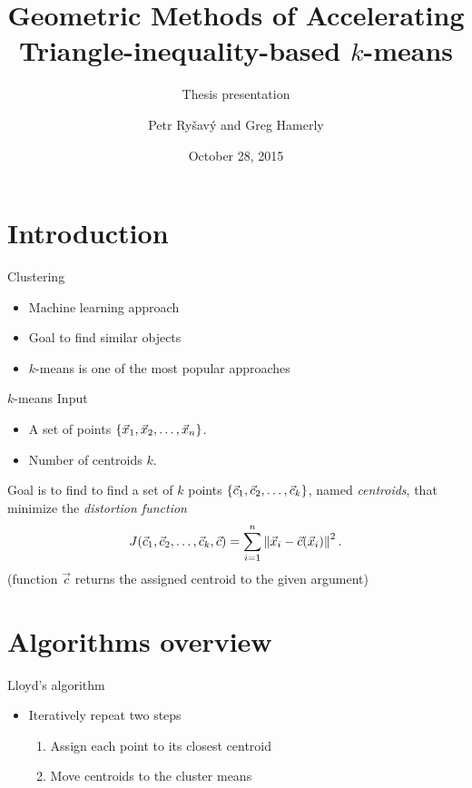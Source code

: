 \documentclass[10pt, compress]{beamer}
\title{Geometric Methods of Accelerating Triangle-inequality-based \texorpdfstring{$k$}{k}-means}
\subtitle{Thesis presentation}
\date{October 28, 2015}
\author{Petr Ry\v{s}av\'{y} and Greg Hamerly}
\institute{Baylor University}
\begin{document}
\maketitle

\section{Introduction}

\begin{frame}{Clustering}
  \begin{itemize}
    \item Machine learning approach
    \item Goal to find similar objects
    \item $k$-means is one of the most popular approaches
  \end{itemize}
\end{frame}

\begin{frame}{\texorpdfstring{$k$}{k}-means}
  Input
  \begin{itemize}
    \item A set of points $\left\{ {\vec{x}}_1, {\vec{x}}_2, \ldots, {\vec{x}}_{n} \right\}$.
    \item Number of centroids $k$.
  \end{itemize}
  Goal is to find to find a set of $k$ points $\left\{ {\vec{c}}_1, {\vec{c}}_2, \ldots, {\vec{c}}_{k} \right\}$, named \emph{centroids},
  that minimize the \emph{distortion function}
  \begin{equation*}
    J({\vec{c}}_1, {\vec{c}}_2, \ldots, {\vec{c}}_{k}, \vec{c}) = \sum_{i=1}^n \left\| \vec{x}_i - \vec{c}(\vec{x}_i) \right\|^2.
    \label{eq:distortion}
  \end{equation*}
  (function $\vec{c}$ returns the assigned centroid to the given argument)
\end{frame}

\begin{frame}
  
\end{frame}

\section{Algorithms overview}

\begin{frame}{Lloyd's algorithm}
  \begin{itemize}
     \item Iteratively repeat two steps
     \begin{enumerate}
       \item Assign each point to its closest centroid
       \item Move centroids to the cluster means
     \end{enumerate}
  \end{itemize}
\end{frame}
\end{document}
